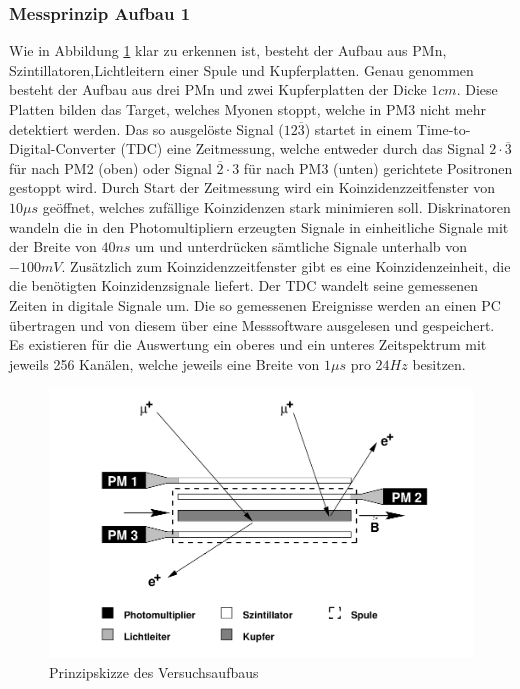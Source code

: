         \subsubsection{Messprinzip Aufbau 1}
            Wie in Abbildung \ref{prinzip} klar zu erkennen ist, besteht der Aufbau aus PMn, Szintillatoren,Lichtleitern einer Spule und Kupferplatten. Genau genommen besteht der Aufbau aus drei PMn und zwei Kupferplatten der Dicke $1\unit{cm}$. Diese Platten bilden das Target, welches Myonen stoppt, welche in PM3 nicht mehr detektiert werden. Das so ausgelöste Signal ($12\overline{3}$) startet in einem Time-to-Digital-Converter (TDC) eine Zeitmessung, welche entweder durch das Signal $2\cdot\overline 3$ für nach PM2 (oben) oder Signal $\overline 2 \cdot 3$ für nach PM3 (unten) gerichtete Positronen gestoppt wird. Durch Start der Zeitmessung wird ein Koinzidenzzeitfenster von $10\unit{\mu s}$ geöffnet, welches zufällige Koinzidenzen stark minimieren soll. Diskrinatoren wandeln die in den Photomultipliern erzeugten Signale in einheitliche Signale mit der Breite von $40\unit{ns}$ um und unterdrücken sämtliche Signale unterhalb von $-100\unit{mV}$.
            Zusätzlich zum Koinzidenzzeitfenster gibt es eine Koinzidenzeinheit, die die benötigten Koinzidenzsignale liefert. Der TDC wandelt seine gemessenen Zeiten in digitale Signale um. Die so gemessenen Ereignisse werden an einen PC übertragen und von diesem über eine Messsoftware ausgelesen und gespeichert. Es existieren für die Auswertung ein oberes und ein unteres Zeitspektrum mit jeweils 256 Kanälen, welche jeweils eine Breite von $1\unit{\mu s}$ pro $24Hz$ besitzen. 
            \begin{figure}
                \centering \includegraphics[scale=1.2]{pic/aufbau.png}
                \caption{\cite{pm} Prinzipskizze des Versuchsaufbaus}
                \label{prinzip}
            \end{figure}
